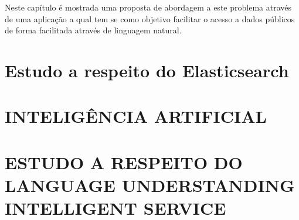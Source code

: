 Neste capítulo é mostrada uma proposta de abordagem a este problema através de uma aplicação a qual tem se como objetivo facilitar o acesso a dados públicos de forma facilitada através de linguagem natural.

\section{Estudo a respeito do Elasticsearch}


\section{\uppercase{Inteligência Artificial}}


\section{\uppercase{Estudo a respeito do Language Understanding Intelligent Service}}



